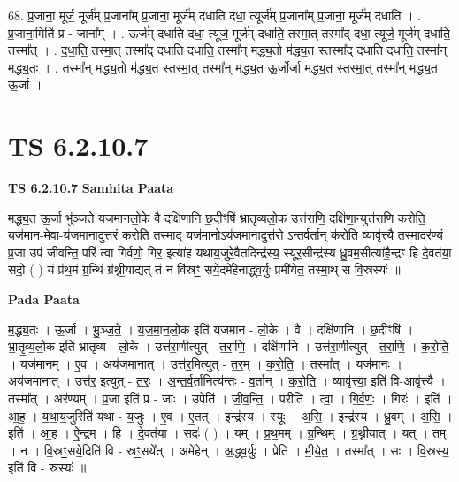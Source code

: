 \documentclass[17pt]{extarticle}
\begin{document}
68. प्र॒जाना॒ मूर्ज॒ मूर्ज॑म् प्र॒जाना᳚म् प्र॒जाना॒ मूर्ज॑म् दधाति दधा॒ त्यूर्ज॑म् प्र॒जाना᳚म् प्र॒जाना॒ मूर्ज॑म् दधाति । . प्र॒जाना॒मिति॑ प्र - जाना᳚म् । . ऊर्ज॑म् दधाति दधा॒ त्यूर्ज॒ मूर्ज॑म् दधाति॒ तस्मा॒त् तस्मा᳚द् दधा॒ त्यूर्ज॒ मूर्ज॑म् दधाति॒ तस्मा᳚त् । . द॒धा॒ति॒ तस्मा॒त् तस्मा᳚द् दधाति दधाति॒ तस्मा᳚न् मद्ध्य॒तो म॑द्ध्य॒त स्तस्मा᳚द् दधाति दधाति॒ तस्मा᳚न् मद्ध्य॒तः । . तस्मा᳚न् मद्ध्य॒तो म॑द्ध्य॒त स्तस्मा॒त् तस्मा᳚न् मद्ध्य॒त ऊ॒र्जोर्जा म॑द्ध्य॒त स्तस्मा॒त् तस्मा᳚न् मद्ध्य॒त ऊ॒र्जा । \newline
\pagebreak
{}

\section{ TS 6.2.10.7 }

\textbf{TS 6.2.10.7 } \newline
\textbf{Samhita Paata} \newline

मद्ध्य॒त ऊ॒र्जा भु॑ञ्जते यजमानलो॒के वै दक्षि॑णानि छ॒दीꣳषि॑ भ्रातृव्यलो॒क उत्त॑राणि॒ दक्षि॑णा॒न्युत्त॑राणि करोति॒ यज॑मान-मे॒वा-य॑जमाना॒दुत्त॑रं करोति॒ तस्मा॒द् यज॑मा॒नोऽय॑जमाना॒दुत्त॑रो ऽन्तर्व॒र्तान् क॑रोति॒ व्यावृ॑त्त्यै॒ तस्मा॒दर॑ण्यं प्र॒जा उप॑ जीवन्ति॒ परि॑ त्वा गिर्वणो॒ गिर॒ इत्या॑ह यथाय॒जुरे॒वैतदिन्द्र॑स्य॒ स्यूर॒सीन्द्र॑स्य ध्रु॒वम॒सीत्या॑है॒न्द्रꣳ हि दे॒वत॑या॒ सदो॒ ( ) यं प्र॑थ॒मं ग्र॒न्थिं ग्र॑थ्नी॒याद्यत् तं न वि॑स्रꣳ॒॒ सये॒दमे॑हेनाद्ध्व॒र्युः प्रमी॑येत॒ तस्मा॒थ् स वि॒स्रस्यः॑ ॥ \newline

\textbf{Pada Paata} \newline

म॒द्ध्य॒तः । ऊ॒र्जा । भु॒ञ्ज॒ते॒ । य॒ज॒मा॒न॒लो॒क इति॑ यजमान - लो॒के । वै । दक्षि॑णानि । छ॒दीꣳषि॑ । भ्रा॒तृ॒व्य॒लो॒क इति॑ भ्रातृव्य - लो॒के । उत्त॑रा॒णीत्युत् - त॒रा॒णि॒ । दक्षि॑णानि । उत्त॑रा॒णीत्युत् - त॒रा॒णि॒ । क॒रो॒ति॒ । यज॑मानम् । ए॒व । अय॑जमानात् । उत्त॑र॒मित्युत् - त॒र॒म् । क॒रो॒ति॒ । तस्मा᳚त् । यज॑मानः । अय॑जमानात् । उत्त॑र॒ इत्युत् - त॒रः॒ । अ॒न्त॒र्व॒र्तानित्य॑न्तः - व॒र्तान् । क॒रो॒ति॒ । व्यावृ॑त्त्या॒ इति॑ वि-आवृ॑त्त्यै । तस्मा᳚त् । अर॑ण्यम् । प्र॒जा इति॑ प्र - जाः । उपेति॑ । जी॒व॒न्ति॒ । परीति॑ । त्वा॒ । गि॒र्व॒णः॒ । गिरः॑ । इति॑ । आ॒ह॒ । य॒था॒य॒जुरिति॑ यथा - य॒जुः । ए॒व । ए॒तत् । इन्द्र॑स्य । स्यूः । अ॒सि॒ । इन्द्र॑स्य । ध्रु॒वम् । अ॒सि॒ । इति॑ । आ॒ह॒ । ऐ॒न्द्रम् । हि । दे॒वत॑या । सदः॑ ( ) । यम् । प्र॒थ॒मम् । ग्र॒न्थिम् । ग्र॒थ्नी॒यात् । यत् । तम् । न । वि॒स्रꣳ॒॒सये॒दिति॑ वि - स्रꣳ॒॒सये᳚त् । अमे॑हेन् । अ॒द्ध्व॒र्युः । प्रेति॑ । मी॒ये॒त॒ । तस्मा᳚त् । सः । वि॒स्रस्य॒ इति॑ वि - स्रस्यः॑ ॥  \newline
\end{document}
